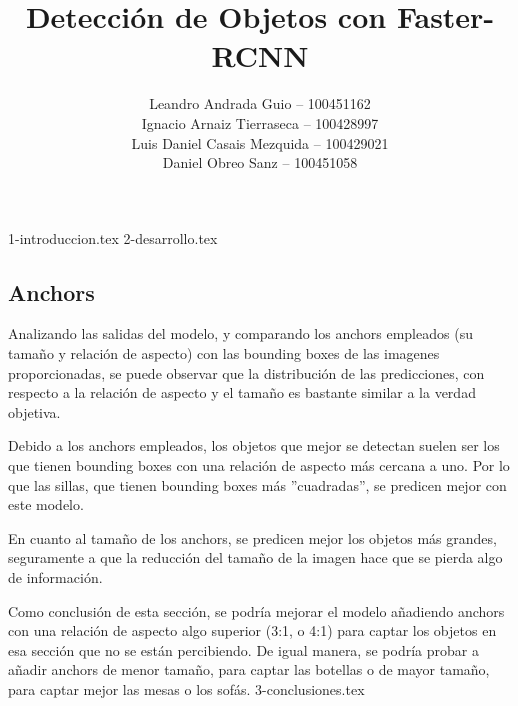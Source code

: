 \documentclass[es]{uc3mreport}
\author{
  Leandro Andrada Guio -- 100451162\\
  Ignacio Arnaiz Tierraseca -- 100428997\\
  Luis Daniel Casais Mezquida -- 100429021\\
  Daniel Obreo Sanz -- 100451058
}
\title{Detección de Objetos con Faster-RCNN}
\begin{document}
  \makecover[old]

  \begin{report}
    {1-introduccion.tex}
    {2-desarrollo.tex}
    \subsection{Anchors}

    Analizando las salidas del modelo, y comparando los anchors empleados 
    (su tamaño y relación de aspecto) con las bounding boxes de las imagenes proporcionadas, 
    se puede observar que la distribución de las predicciones, con respecto a la relación de aspecto 
    y el tamaño es bastante similar a la verdad objetiva.

    Debido a los anchors empleados, los objetos que mejor se detectan suelen ser 
    los que tienen bounding boxes con una relación de aspecto más cercana a uno. 
    Por lo que las sillas, que tienen bounding boxes más ''cuadradas'', se predicen mejor con este modelo.

    En cuanto al tamaño de los anchors, se predicen mejor los objetos más grandes, 
    seguramente a que la reducción del tamaño de la imagen hace que se pierda algo de información.

    Como conclusión de esta sección, se podría mejorar el modelo añadiendo 
    anchors con una relación de aspecto algo superior (3:1, o 4:1) para captar 
    los objetos en esa sección que no se están percibiendo. De igual manera, 
    se podría probar a añadir anchors de menor tamaño, para captar las botellas o de 
    mayor tamaño, para captar mejor las mesas o los sofás.
    {3-conclusiones.tex}
  \end{report}
\end{document}
